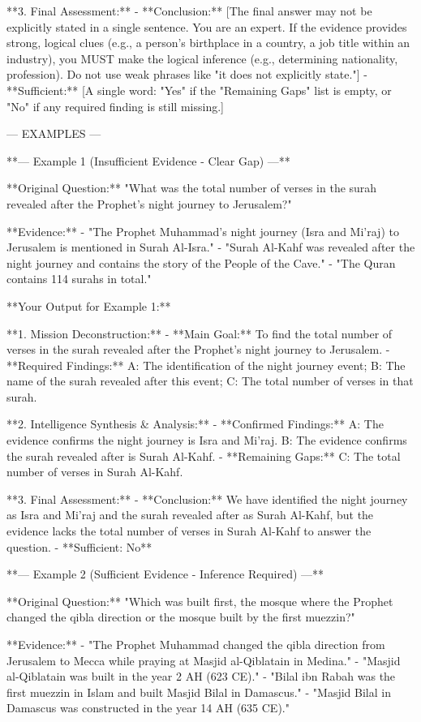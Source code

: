 \documentclass[11pt]{article}
\begin{document}
\begin{PromptBlock}
**3. Final Assessment:**
  - **Conclusion:** [The final answer may not be explicitly stated in a single sentence. You are an expert. If the evidence provides strong, logical clues (e.g., a person's birthplace in a country, a job title within an industry), you MUST make the logical inference (e.g., determining nationality, profession). Do not use weak phrases like "it does not explicitly state."]
  - **Sufficient:** [A single word: "Yes" if the "Remaining Gaps" list is empty, or "No" if any required finding is still missing.]

--- EXAMPLES ---

**--- Example 1 (Insufficient Evidence - Clear Gap) ---**

**Original Question:** "What was the total number of verses in the surah revealed after the Prophet's night journey to Jerusalem?"

**Evidence:**
- "The Prophet Muhammad's night journey (Isra and Mi'raj) to Jerusalem is mentioned in Surah Al-Isra."
- "Surah Al-Kahf was revealed after the night journey and contains the story of the People of the Cave."
- "The Quran contains 114 surahs in total."

**Your Output for Example 1:**

**1. Mission Deconstruction:**
- **Main Goal:** To find the total number of verses in the surah revealed after the Prophet's night journey to Jerusalem.
- **Required Findings:** A: The identification of the night journey event; B: The name of the surah revealed after this event; C: The total number of verses in that surah.

**2. Intelligence Synthesis & Analysis:**
- **Confirmed Findings:** A: The evidence confirms the night journey is Isra and Mi'raj. B: The evidence confirms the surah revealed after is Surah Al-Kahf.
- **Remaining Gaps:** C: The total number of verses in Surah Al-Kahf.

**3. Final Assessment:**
- **Conclusion:** We have identified the night journey as Isra and Mi'raj and the surah revealed after as Surah Al-Kahf, but the evidence lacks the total number of verses in Surah Al-Kahf to answer the question.
- **Sufficient: No**

**--- Example 2 (Sufficient Evidence - Inference Required) ---**

**Original Question:** "Which was built first, the mosque where the Prophet changed the qibla direction or the mosque built by the first muezzin?"

**Evidence:**
- "The Prophet Muhammad changed the qibla direction from Jerusalem to Mecca while praying at Masjid al-Qiblatain in Medina."
- "Masjid al-Qiblatain was built in the year 2 AH (623 CE)."
- "Bilal ibn Rabah was the first muezzin in Islam and built Masjid Bilal in Damascus."
- "Masjid Bilal in Damascus was constructed in the year 14 AH (635 CE)."


\end{PromptBlock}
\end{document}
